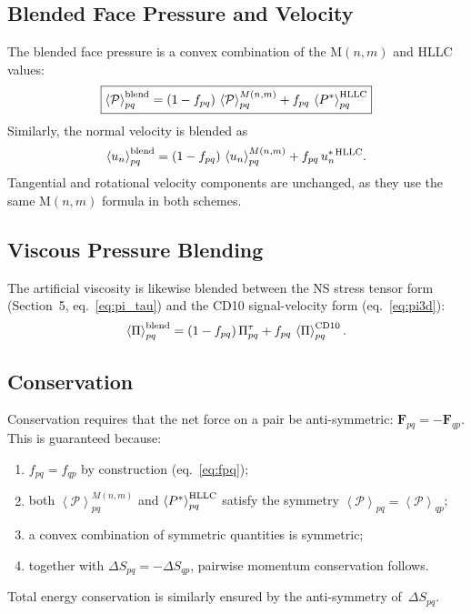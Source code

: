 \documentclass[twocolumn]{aastex63}
\newcommand{\vel}{{u}}
\newcommand{\surf}[0]{S}
\newcommand{\pressure}[0]{\mathcal{P}}
\begin{document}
\subsection{Blended Face Pressure and Velocity}

The blended face pressure is a convex combination of
the M$(n,m)$ and HLLC values:
\begin{equation}\label{eq:pblend}
  \boxed{
  \left<\pressure\right>_{pq}^{\rm blend}
  = (1 - f_{pq})\,\left<\pressure\right>_{pq}^{M(n,m)}
  + f_{pq}\,\left<P^*\right>_{pq}^{\rm HLLC}
  }
\end{equation}
Similarly, the normal velocity is blended as
\begin{equation}\label{eq:vblend}
  \left<\vel_n\right>_{pq}^{\rm blend}
  = (1 - f_{pq})\,\left<\vel_n\right>_{pq}^{M(n,m)}
  + f_{pq}\,\vel_n^{*\,\rm HLLC}.
\end{equation}
Tangential and rotational velocity components are
unchanged, as they use the same M$(n,m)$ formula in
both schemes.

\subsection{Viscous Pressure Blending}

The artificial viscosity is likewise blended between
the NS stress tensor form
(Section~5, eq.~\ref{eq:pi_tau}) and the CD10
signal-velocity form (eq.~\ref{eq:pi3d}):
\begin{equation}\label{eq:piblend}
  \left<\Pi\right>_{pq}^{\rm blend}
  = (1 - f_{pq})\,\Pi_{pq}^{\tau}
  + f_{pq}\,\left<\Pi\right>_{pq}^{\rm CD10}.
\end{equation}

\subsection{Conservation}

Conservation requires that the net force on a pair
be anti-symmetric: $\boldsymbol{F}_{pq} = -\boldsymbol{F}_{qp}$.
This is guaranteed because:
\begin{enumerate}[label=(\roman*)]
  \item $f_{pq} = f_{qp}$ by construction
    (eq.~\ref{eq:fpq});
  \item both $\left<\pressure\right>_{pq}^{M(n,m)}$
    and $\left<P^*\right>_{pq}^{\rm HLLC}$ satisfy
    the symmetry
    $\left<\pressure\right>_{pq}
     = \left<\pressure\right>_{qp}$;
  \item a convex combination of symmetric quantities
    is symmetric;
  \item together with $\Delta\surf_{pq} = -\Delta\surf_{qp}$,
    pairwise momentum conservation follows.
\end{enumerate}
Total energy conservation is similarly ensured by the
anti-symmetry of~$\Delta\surf_{pq}$.
\end{document}
